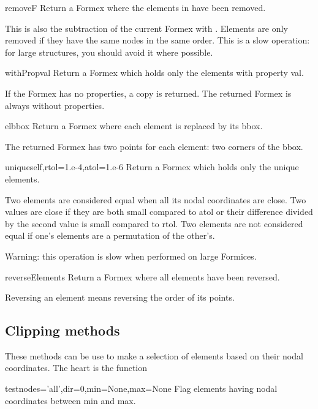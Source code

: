 {{\begin{methoddesc}{remove}{F}
Return a Formex where the elements in  have been removed.

This is also the subtraction of the current Formex with . Elements are only removed if they have the same nodes in the same order. This is a slow operation: for large structures, you should avoid it where possible.
\end{methoddesc}

\begin{methoddesc}{withProp}{val}
Return a Formex which holds only the elements with property val.

If the Formex has no properties, a copy is returned.
The returned Formex is always without properties.
\end{methoddesc}

\begin{methoddesc}{elbbox}{}
Return a Formex where each element is replaced by its bbox.

The returned Formex has two points for each element: two corners
of the bbox.
\end{methoddesc}

\begin{methoddesc}{unique}{self,rtol=1.e-4,atol=1.e-6}
Return a Formex which holds only the unique elements.

Two elements are considered equal when all its nodal coordinates
are close. Two values are close if they are both small compared to atol
or their difference divided by the second value is small compared to
rtol.
Two elements are not considered equal if one's elements are a
permutation of the other's.

Warning: this operation is slow when performed on large Formices.
\end{methoddesc}

\begin{methoddesc}{reverseElements}{}
Return a Formex where all elements have been reversed.

Reversing an element means reversing the order of its points.
\end{methoddesc}


\subsection{Clipping methods}
These methods can be use to make a selection of elements based on their nodal coordinates. The heart is the function
\begin{methoddesc}{test}{nodes='all',dir=0,min=None,max=None}
Flag elements having nodal coordinates between min and max.


\end{methoddesc}}}
